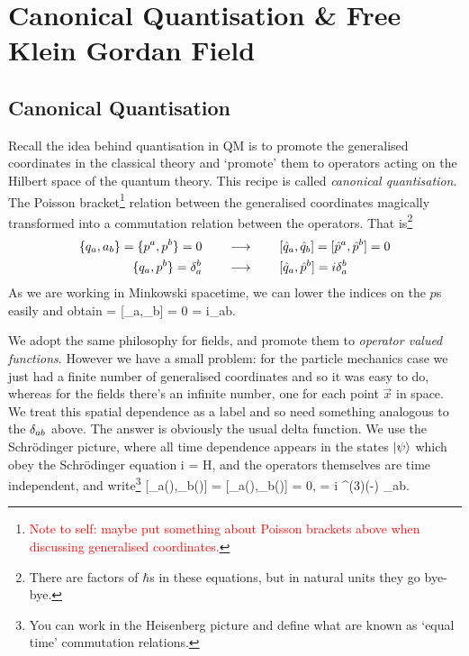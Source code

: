 \chapter{Canonical Quantisation \& Free Klein Gordan Field}

\section{Canonical Quantisation}

Recall the idea behind quantisation in QM is to promote the generalised coordinates in the classical theory and `promote' them to operators acting on the Hilbert space of the quantum theory. This recipe is called \textit{canonical quantisation}. The Poisson bracket\footnote{\textcolor{red}{Note to self: maybe put something about Poisson brackets above when discussing generalised coordinates.}} relation between the generalised coordinates magically transformed into a commutation relation between the operators. That is\footnote{There are factors of $\hbar$s in these equations, but in natural units they go bye-bye.} 
\begin{equation*}
    \begin{split}
        \{q_a,a_b\} = \{p^a,p^b\} = 0 \qquad & \longrightarrow \qquad [\hat{q}_a,\hat{q}_b] = [\hat{p}^a,\hat{p}^b] = 0 \\
        \{q_a,p^b\} = \delta^b_a \qquad & \longrightarrow \qquad [\hat{q}_a,\hat{p}^b] = i\delta^b_a
    \end{split}
\end{equation*} 
As we are working in Minkowski spacetime, we can lower the indices on the $p$s easily and obtain 
 = [_a,_b] = 0  = i\del_{ab}.
\ese 

We adopt the same philosophy for fields, and promote them to \textit{operator valued functions}. However we have a small problem: for the particle mechanics case we just had a finite number of generalised coordinates and so it was easy to do, whereas for the fields there's an infinite number, one for each point $\Vec{x}$ in space. We treat this spatial dependence as a label and so need something analogous to the $\delta_{ab}$ above. The answer is obviously the usual delta function.  We use the Schr\"{o}dinger picture, where all time dependence appears in the states $\ket{\psi}$ which obey the Schr\"{o}dinger equation
\bse 
    i = H\ket{\psi},
\ese 
and the operators themselves are time independent, and write\footnote{You can work in the Heisenberg picture and define what are known as `equal time' commutation relations.}
\be 
\label{eqn:FieldsCommutation}
    [\phi_a(),\phi_b()] = [\pi_a(),\pi_b()] = 0,  = i \del^{(3)}(-) \del_{ab}.
\ee 

